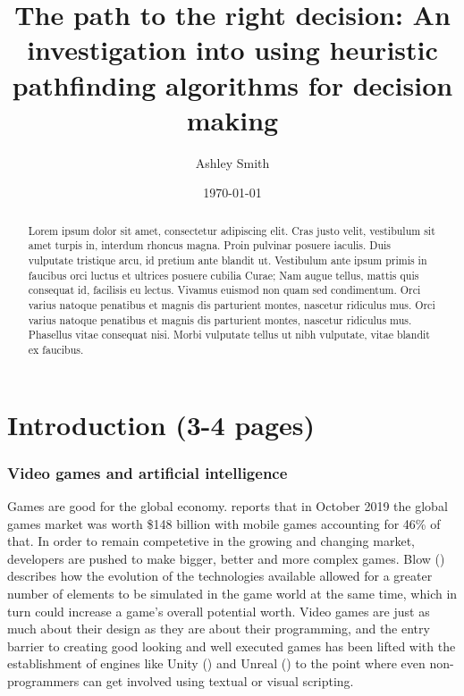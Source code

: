 \documentclass[10pt]{article}
\begin{document}
\title{\titlefont The path to the right decision: An investigation into using heuristic pathfinding algorithms for decision making}
\author{Ashley Smith}
\date{\today}
\maketitle

\renewcommand\abstractname{\textbf{Abstract}}
\begin{abstract}
Lorem ipsum dolor sit amet, consectetur adipiscing elit. Cras justo velit, vestibulum sit amet turpis in, interdum rhoncus magna. Proin pulvinar posuere iaculis. Duis vulputate tristique arcu, id pretium ante blandit ut. Vestibulum ante ipsum primis in faucibus orci luctus et ultrices posuere cubilia Curae; Nam augue tellus, mattis quis consequat id, facilisis eu lectus. Vivamus euismod non quam sed condimentum. Orci varius natoque penatibus et magnis dis parturient montes, nascetur ridiculus mus. Orci varius natoque penatibus et magnis dis parturient montes, nascetur ridiculus mus. Phasellus vitae consequat nisi. Morbi vulputate tellus ut nibh vulputate, vitae blandit ex faucibus.
\end{abstract}

\clearpage
\section{Introduction (3-4 pages)}

\subsubsection{Video games and artificial intelligence}

Games are good for the global economy. \citeauthor{Newzoo} reports that in October 2019 the global games market was worth \$148 billion with mobile games accounting for 46\% of that. In order to remain competetive in the growing and changing market, developers are pushed to make bigger, better and more complex games. Blow (\citeyear{blow2004game}) describes how the evolution of the technologies available allowed for a greater number of elements to be simulated in the game world at the same time, which in turn could increase a game's overall potential worth. Video games are just as much about their design as they are about their programming, and the entry barrier to creating good looking and well executed games has been lifted with the establishment of engines like Unity (\cite{Unity}) and Unreal (\cite{Unreal}) to the point where even non-programmers can get involved using textual or visual scripting.
\end{document}
